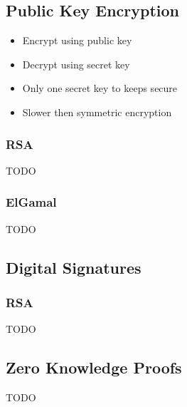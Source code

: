 \documentclass[a4paper]{article}
\begin{document}
\subsection{Public Key Encryption}

\begin{itemize}
  \item Encrypt using public key
  \item Decrypt using secret key
  \item Only one secret key to keeps secure
  \item Slower then symmetric encryption
\end{itemize}

\subsubsection{RSA}

TODO

\subsubsection{ElGamal}

TODO

\subsection{Digital Signatures}

\subsubsection{RSA}

TODO

\subsection{Zero Knowledge Proofs}

TODO
\end{document}
